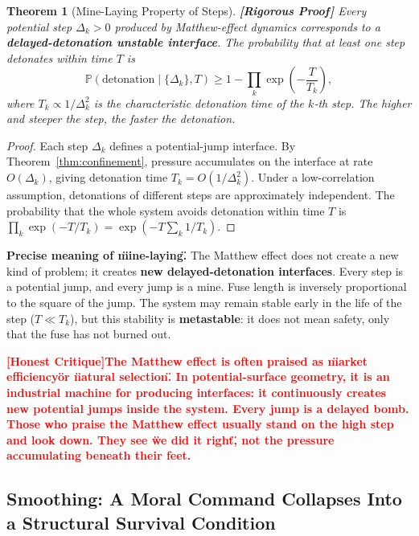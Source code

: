 \documentclass[12pt,a4paper]{article}
\newtheorem{theorem}{Theorem}[section]
\theoremstyle{remark}
\newcommand{\Pbb}{\mathbb{P}}
\newcommand{\honestcrit}[1]{%
    \textcolor{red}{\textbf{[Honest Critique]#1}}%
}
\newcommand{\rigorFull}{\textnormal{\textbf{[Rigorous Proof]}}}
\begin{document}
\begin{theorem}[Mine-Laying Property of Steps]\label{thm:step_mine}\rigorFull
Every potential step $\Delta_k > 0$ produced by Matthew-effect dynamics corresponds to a \textbf{delayed-detonation unstable interface}. The probability that at least one step detonates within time $T$ is
\begin{equation}
    \Pbb(\text{detonation} \mid \{\Delta_k\}, T) \geq 1 - \prod_k \exp\left(-\frac{T}{T_k}\right),
\end{equation}
where $T_k \propto 1/\Delta_k^2$ is the characteristic detonation time of the $k$-th step. The higher and steeper the step, the faster the detonation.
\end{theorem}

\begin{proof}
Each step $\Delta_k$ defines a potential-jump interface. By Theorem~\ref{thm:confinement}, pressure accumulates on the interface at rate $O(\Delta_k)$, giving detonation time $T_k = O(1/\Delta_k^2)$. Under a low-correlation assumption, detonations of different steps are approximately independent. The probability that the whole system avoids detonation within time $T$ is $\prod_k \exp(-T/T_k) = \exp(-T \sum_k 1/T_k)$.
\end{proof}

\textbf{Precise meaning of \"mine-laying\".} The Matthew effect does not create a new kind of problem; it creates \textbf{new delayed-detonation interfaces}. Every step is a potential jump, and every jump is a mine. Fuse length is inversely proportional to the square of the jump. The system may remain stable early in the life of the step ($T \ll T_k$), but this stability is \textbf{metastable}: it does not mean safety, only that the fuse has not burned out.

\honestcrit{The Matthew effect is often praised as \"market efficiency\" or \"natural selection\". In potential-surface geometry, it is an \textbf{industrial machine for producing interfaces}: it continuously creates new potential jumps inside the system. Every jump is a delayed bomb. Those who praise the Matthew effect usually stand on the high step and look down. They see \"we did it right\", not the pressure accumulating beneath their feet.}

\subsection{Smoothing: A Moral Command Collapses Into a Structural Survival Condition}
\end{document}
